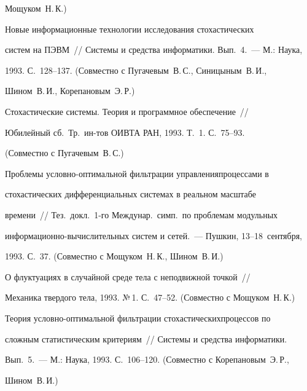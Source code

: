 Мощуком~Н.\,К.)










 Новые информационные технологии исследования стохастических


систем на ПЭВМ~// Системы и средства информатики. Вып.~4.~--- М.: Наука,


1993. С.~128--137. (Совместно с Пугачевым~В.\,С., Синицыным~В.\,И.,


Шином~В.\,И., Корепановым~Э.\,Р.)





 Стохастические системы. Теория и программное обеспечение~//


Юбилейный сб.\ Тр.\ ин-тов ОИВТА РАН, 1993. Т.~1. С.~75--93.


(Совместно с Пугачевым~В.\,С.)





 Проблемы условно-оптимальной фильтрации управления\linebreak процессами в


стохастических дифференциальных системах в реальном масштабе


времени~// Тез.\ докл.\ 1-го Междунар.\ симп.\ по проблемам модульных


ин\-фор\-ма\-ци\-он\-но-вы\-чис\-ли\-тель\-ных сис\-тем и сетей.~--- Пушкин, 13--18~сентября,


1993. С.~37. (Совместно с Мощуком~Н.\,К., Шином~В.\,И.)





 О флуктуациях в случайной среде тела с неподвижной точкой~//


Механика твердого тела, 1993. №\,1. С.~47--52. (Совместно с Мощуком~Н.\,К.)





 Теория условно-оптимальной фильтрации стохастических\linebreak процессов по


сложным статистическим критериям~// Системы и средства информатики.


Вып.~5.~--- М.: Наука, 1993. С.~106--120. (Совместно с Корепановым~Э.\,Р.,


Шином~В.\,И.)





